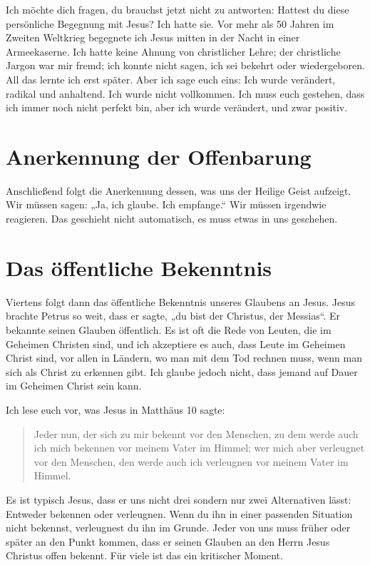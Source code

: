 Ich möchte dich fragen, du brauchst jetzt nicht zu antworten: Hattest du diese persönliche Begegnung mit Jesus?
Ich hatte sie.
Vor mehr als 50 Jahren im Zweiten Weltkrieg begegnete ich Jesus mitten in der Nacht in einer Armeekaserne.
Ich hatte keine Ahnung von christlicher Lehre; der christliche Jargon war mir fremd; ich konnte nicht sagen, ich sei bekehrt oder wiedergeboren.
All das lernte ich erst später.
Aber ich sage euch eins: Ich wurde verändert, radikal und anhaltend. Ich wurde nicht vollkommen.
Ich muss euch gestehen, dass ich immer noch nicht perfekt bin, aber ich wurde verändert, und zwar positiv.

\section{Anerkennung der Offenbarung}

Anschließend folgt die Anerkennung dessen, was uns der Heilige Geist aufzeigt.
Wir müssen sagen: „Ja, ich glaube. Ich empfange.“ Wir müssen irgendwie reagieren.
Das geschieht nicht automatisch, es muss etwas in uns geschehen.

\section{Das öffentliche Bekenntnis}

Viertens folgt dann das öffentliche Bekenntnis unseres Glaubens an Jesus. 
Jesus brachte Petrus so weit, dass er sagte, „du bist der Christus, der Messias“. 
Er bekannte seinen Glauben öffentlich. 
Es ist oft die Rede von Leuten, die im Geheimen Christen sind, und ich akzeptiere es auch, dass Leute im Geheimen Christ sind, vor allen in Ländern, wo man mit dem Tod rechnen muss, wenn man sich als Christ zu erkennen gibt.
Ich glaube jedoch nicht, dass jemand auf Dauer im Geheimen Christ sein kann.

Ich lese euch vor, was Jesus in Matthäus 10 sagte:

\begin{quotation}
  Jeder nun, der sich zu mir bekennt vor den Menschen, zu dem werde auch ich mich bekennen vor meinem Vater im Himmel; wer mich aber verleugnet vor den Menschen, den werde auch ich verleugnen vor meinem Vater im Himmel.
\end{quotation}

Es ist typisch Jesus, dass er uns nicht drei sondern nur zwei Alternativen lässt: Entweder bekennen oder verleugnen. 
Wenn du ihn in einer passenden Situation nicht bekennst, verleugnest du ihn im Grunde. 
Jeder von uns muss früher oder später an den Punkt kommen, dass er seinen Glauben an den Herrn Jesus Christus offen bekennt. 
Für viele ist das ein kritischer Moment.

